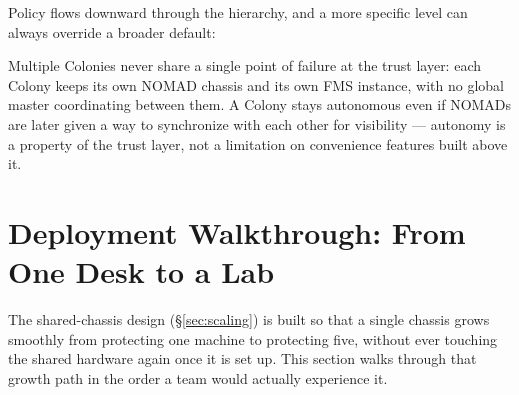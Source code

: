 \documentclass[11pt,a4paper]{article}
\begin{document}
Policy flows downward through the hierarchy, and a more specific level
can always override a broader default:

\begin{center}
\end{center}

Multiple Colonies never share a single point of failure at the trust
layer: each Colony keeps its own NOMAD chassis and its own FMS instance,
with no global master coordinating between them. A Colony stays
autonomous even if NOMADs are later given a way to synchronize with each
other for visibility --- autonomy is a property of the trust layer, not
a limitation on convenience features built above it.

\section{Deployment Walkthrough: From One Desk to a Lab}
\label{sec:walkthrough}

The shared-chassis design (\S\ref{sec:scaling}) is built so that a
single chassis grows smoothly from protecting one machine to protecting
five, without ever touching the shared hardware again once it is set
up. This section walks through that growth path in the order a team
would actually experience it.
\end{document}
